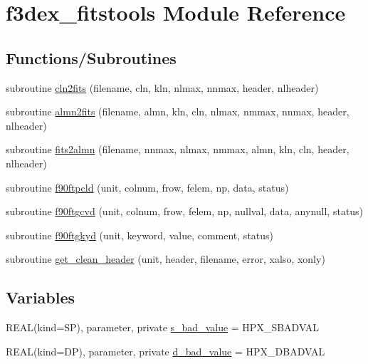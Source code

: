 \hypertarget{namespacef3dex__fitstools}{
\section{f3dex\_\-fitstools Module Reference}
\label{namespacef3dex__fitstools}
}
\subsection*{Functions/Subroutines}
\begin{DoxyCompactItemize}
\item 
subroutine \hyperlink{namespacef3dex__fitstools_aab1f14e65c2837494cb15ff4fd54b372}{cln2fits} (filename, cln, kln, nlmax, nnmax, header, nlheader)
\item 
subroutine \hyperlink{namespacef3dex__fitstools_a3bb8fd149a1c137d3176d484e28bbef0}{almn2fits} (filename, almn, kln, cln, nlmax, nmmax, nnmax, header, nlheader)
\item 
subroutine \hyperlink{namespacef3dex__fitstools_a106cd0d1eb3bcd38d2c43228f499f57b}{fits2almn} (filename, nnmax, nlmax, nmmax, almn, kln, cln, header, nlheader)
\item 
subroutine \hyperlink{namespacef3dex__fitstools_a83e1158f828e86e43f1dc68bc0e7c59b}{f90ftpcld} (unit, colnum, frow, felem, np, data, status)
\item 
subroutine \hyperlink{namespacef3dex__fitstools_ada7b447f4ace46eabf663495c3a8c8c2}{f90ftgcvd} (unit, colnum, frow, felem, np, nullval, data, anynull, status)
\item 
subroutine \hyperlink{namespacef3dex__fitstools_ab7baecf48bb7833c32bc7be570f947c1}{f90ftgkyd} (unit, keyword, value, comment, status)
\item 
subroutine \hyperlink{namespacef3dex__fitstools_a0d143b6a055e5c50c19b86e75d94c663}{get\_\-clean\_\-header} (unit, header, filename, error, xalso, xonly)
\end{DoxyCompactItemize}
\subsection*{Variables}
\begin{DoxyCompactItemize}
\item 
REAL(kind=SP), parameter, private \hyperlink{namespacef3dex__fitstools_a7841ef704a851792da5858a872caa0e4}{s\_\-bad\_\-value} = HPX\_\-SBADVAL
\item 
REAL(kind=DP), parameter, private \hyperlink{namespacef3dex__fitstools_ae70f4f4f98f16a18e429bfd5f014d650}{d\_\-bad\_\-value} = HPX\_\-DBADVAL
\end{DoxyCompactItemize}


